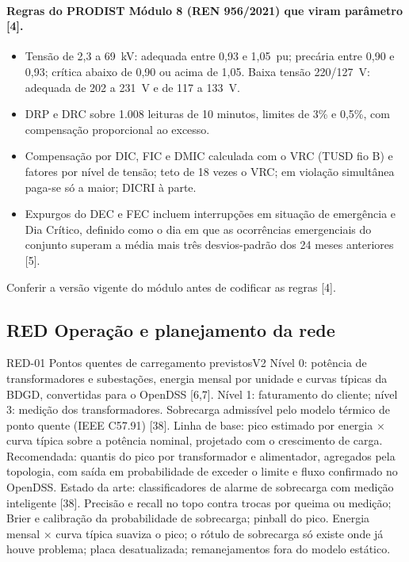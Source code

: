 \paragraph{Regras do PRODIST Módulo 8 (REN 956/2021) que viram parâmetro [4].}
\begin{itemize}
  \item Tensão de 2,3 a 69~kV: adequada entre 0,93 e 1,05~pu; precária entre
    0,90 e 0,93; crítica abaixo de 0,90 ou acima de 1,05. Baixa tensão
    220/127~V: adequada de 202 a 231~V e de 117 a 133~V.
  \item DRP e DRC sobre 1.008 leituras de 10 minutos, limites de 3\% e 0,5\%,
    com compensação proporcional ao excesso.
  \item Compensação por DIC, FIC e DMIC calculada com o VRC (TUSD fio B) e
    fatores por nível de tensão; teto de 18 vezes o VRC; em violação
    simultânea paga-se só a maior; DICRI à parte.
  \item Expurgos do DEC e FEC incluem interrupções em situação de emergência
    e Dia Crítico, definido como o dia em que as ocorrências emergenciais do
    conjunto superam a média mais três desvios-padrão dos 24 meses anteriores
    [5].
\end{itemize}
Conferir a versão vigente do módulo antes de codificar as regras [4].

\subsection{RED \textperiodcentered{} Operação e planejamento da rede}

\begin{ficha}{RED-01 \textperiodcentered{} Pontos quentes de carregamento previstos}{V2}
 Nível 0: potência de transformadores e subestações, energia
mensal por unidade e curvas típicas da BDGD, convertidas para o OpenDSS [6,7].
Nível 1: faturamento do cliente; nível 3: medição dos transformadores.
Sobrecarga admissível pelo modelo térmico de ponto quente (IEEE C57.91) [38].
 Linha de base: pico estimado por energia × curva típica
sobre a potência nominal, projetado com o crescimento de carga. Recomendada:
quantis do pico por transformador e alimentador, agregados pela topologia,
com saída em probabilidade de exceder o limite e fluxo confirmado no
OpenDSS. Estado da arte: classificadores de alarme de sobrecarga com medição
inteligente [38].
 Precisão e recall no topo contra trocas por queima ou
medição; Brier e calibração da probabilidade de sobrecarga; pinball do pico.
 Energia mensal × curva típica suaviza o pico; o rótulo de
sobrecarga só existe onde já houve problema; placa desatualizada; remanejamentos
fora do modelo estático.
\end{ficha}

